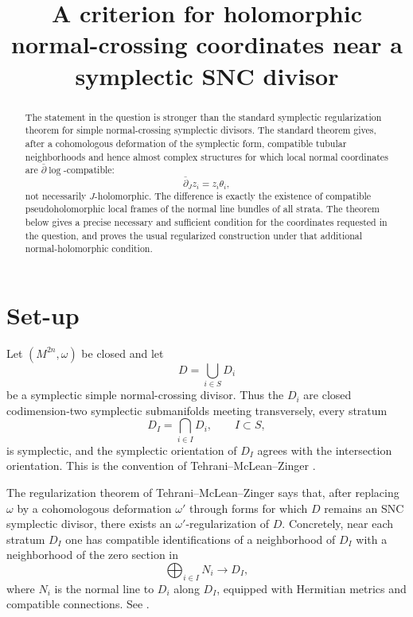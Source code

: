 \documentclass[11pt]{article}
\begin{document}
\title{A criterion for holomorphic normal-crossing coordinates near a symplectic SNC divisor}
\author{}
\date{}
\maketitle

\begin{abstract}
The statement in the question is stronger than the standard symplectic
regularization theorem for simple normal-crossing symplectic divisors.  The
standard theorem gives, after a cohomologous deformation of the symplectic
form, compatible tubular neighborhoods and hence almost complex structures for
which local normal coordinates are \(\bar\partial\log\)-compatible:
\[
        \bar\partial_J z_i=z_i\theta_i ,
\]
not necessarily \(J\)-holomorphic.  The difference is exactly the existence of
compatible pseudoholomorphic local frames of the normal line bundles of all
strata.  The theorem below gives a precise necessary and sufficient condition
for the coordinates requested in the question, and proves the usual
regularized construction under that additional normal-holomorphic condition.
\end{abstract}

\section{Set-up}

Let \((M^{2n},\omega)\) be closed and let
\[
        D=\bigcup_{i\in S}D_i
\]
be a symplectic simple normal-crossing divisor.  Thus the \(D_i\) are closed
codimension-two symplectic submanifolds meeting transversely, every stratum
\[
        D_I=\bigcap_{i\in I}D_i,\qquad I\subset S,
\]
is symplectic, and the symplectic orientation of \(D_I\) agrees with the
intersection orientation.  This is the convention of
Tehrani--McLean--Zinger \cite[Definition 2.1]{TMZ}.

The regularization theorem of Tehrani--McLean--Zinger says that, after replacing
\(\omega\) by a cohomologous deformation \(\omega'\) through forms for which
\(D\) remains an SNC symplectic divisor, there exists an \(\omega'\)-regularization
of \(D\).  Concretely, near each stratum \(D_I\) one has compatible
identifications of a neighborhood of \(D_I\) with a neighborhood of the zero
section in
\[
        \bigoplus_{i\in I} N_i \longrightarrow D_I ,
\]
where \(N_i\) is the normal line to \(D_i\) along \(D_I\), equipped with
Hermitian metrics and compatible connections.  See
\cite[Definitions 2.9--2.12 and Theorem 2.13]{TMZ}.
\end{document}
